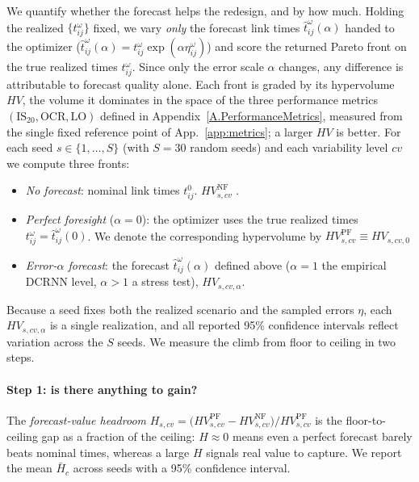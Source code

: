 \documentclass[a4paper,fleqn]{cas-sc}
\begin{document}
We quantify whether the forecast helps the redesign, and by how much. Holding the realized  $\{t_{ij}^{\omega}\}$ fixed, we vary \emph{only} the forecast link times $\hat{t}_{ij}^{\omega}(\alpha)$ handed to the optimizer ($\hat t_{ij}^{\omega}(\alpha)=t_{ij}^{\omega}\exp(\alpha\eta_{ij}^{\omega})$) and score the returned Pareto front on the true realized times $t_{ij}^{\omega}$. Since only the error scale $\alpha$ changes, any difference is attributable to forecast quality alone. Each front is graded by its hypervolume $HV$, the volume it dominates in the space of the three performance metrics $(\mathrm{IS}_{20},\mathrm{OCR},\mathrm{LO})$ defined in Appendix~\ref{A.PerformanceMetrics}, measured from the single fixed reference point of App.~\ref{app:metrics}; a larger $HV$ is better. For each seed $s\in\{1,\dots,S\}$ (with $S=30$ random seeds) and each variability level $\textit{cv}$ we compute three fronts:
\begin{itemize}
    \item \emph{No forecast}:  nominal link times $t_{ij}^{0}$.  $HV^{\mathrm{NF}}_{s,\textit{cv}}$ .

    \item \emph{Perfect foresight} ($\alpha=0$): the optimizer uses the true realized times $t_{ij}^{\omega}=\hat{t}_{ij}^{\omega}(0)$. We denote the corresponding hypervolume by $HV^{\mathrm{PF}}_{s,\textit{cv}}\equiv HV_{s,\textit{cv},0}$ 

    \item \emph{Error-$\alpha$ forecast}: the forecast $\hat{t}_{ij}^{\omega}(\alpha)$ defined above ($\alpha=1$ the empirical DCRNN level, $\alpha>1$ a stress test),  $HV_{s,\textit{cv},\alpha}$.
\end{itemize}
Because a seed fixes both the realized scenario and the sampled errors $\eta$, each $HV_{s,\textit{cv},\alpha}$ is a single realization, and all reported 95\% confidence intervals reflect variation across the $S$ seeds. We measure the climb from floor to ceiling in two steps.

\paragraph{Step 1: is there anything to gain?} The \emph{forecast-value headroom} $H_{s,\textit{cv}}=\bigl(HV^{\mathrm{PF}}_{s,\textit{cv}}-HV^{\mathrm{NF}}_{s,\textit{cv}}\bigr)/HV^{\mathrm{PF}}_{s,\textit{cv}}$ is the floor-to-ceiling gap as a fraction of the ceiling: $H\approx0$ means even a perfect forecast barely beats nominal times, whereas a large $H$ signals real value to capture. We report the mean $\bar H_c$ across seeds with a 95\% confidence interval.
\end{document}

